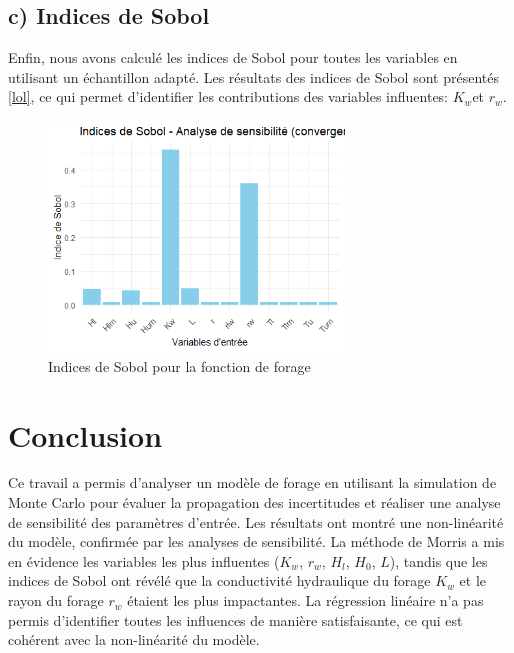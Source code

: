 \documentclass[a4paper,12pt]{article}
\begin{document}
\subsection{c) Indices de Sobol}
Enfin, nous avons calculé les indices de Sobol pour toutes les variables en utilisant un échantillon adapté. Les résultats des indices de Sobol sont présentés \autoref{lol}, ce qui permet d'identifier les contributions des variables influentes: \(K_w\)et \(r_w\).

\begin{figure}[H]
    \centering
    \includegraphics[width=0.7\textwidth]{sobolol.png}
    \caption{Indices de Sobol pour la fonction de forage}
    \label{lol}
\end{figure}

\section{Conclusion}
Ce travail a permis d'analyser un modèle de forage en utilisant la simulation de Monte Carlo pour évaluer la propagation des incertitudes et réaliser une analyse de sensibilité des paramètres d'entrée. Les résultats ont montré une non-linéarité du modèle, confirmée par les analyses de sensibilité. La méthode de Morris a mis en évidence les variables les plus influentes (\(K_w\), \(r_w\), \(H_l\), \(H_0\), \(L\)), tandis que les indices de Sobol ont révélé que la conductivité hydraulique du forage \(K_w\) et le rayon du forage \(r_w\) étaient les plus impactantes. La régression linéaire n’a pas permis d’identifier toutes les influences de manière satisfaisante, ce qui est cohérent avec la non-linéarité du modèle.
\end{document}
